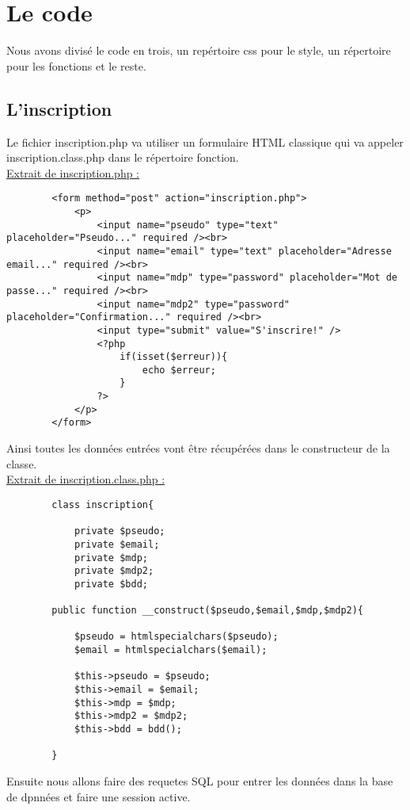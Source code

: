 \documentclass{article}
\begin{document}
    \section{Le code}
    Nous avons divisé le code en trois, un repértoire css pour le style, un répertoire pour les fonctions et le reste. 
    \subsection{L'inscription}
    Le fichier inscription.php va utiliser un formulaire HTML classique qui va appeler inscription.class.php dans le répertoire fonction. \\
    \underline{Extrait de inscription.php :} 
    \begin{lstlisting}
        <form method="post" action="inscription.php">
            <p>
                <input name="pseudo" type="text" placeholder="Pseudo..." required /><br>
                <input name="email" type="text" placeholder="Adresse email..." required /><br>
                <input name="mdp" type="password" placeholder="Mot de passe..." required /><br>
                <input name="mdp2" type="password" placeholder="Confirmation..." required /><br>
                <input type="submit" value="S'inscrire!" />
                <?php 
                    if(isset($erreur)){
                        echo $erreur;
                    }
                ?>
            </p>
        </form>
    \end{lstlisting}
    Ainsi toutes les données entrées vont être récupérées dans le constructeur de la classe. \\
    \underline{Extrait de inscription.class.php :}
    \begin{lstlisting}
        class inscription{
    
            private $pseudo;
            private $email;
            private $mdp;
            private $mdp2;
            private $bdd;
    
        public function __construct($pseudo,$email,$mdp,$mdp2){
    
            $pseudo = htmlspecialchars($pseudo);
            $email = htmlspecialchars($email);
        
            $this->pseudo = $pseudo; 
            $this->email = $email;
            $this->mdp = $mdp;
            $this->mdp2 = $mdp2;
            $this->bdd = bdd();
        
        }
    \end{lstlisting}
    Ensuite nous allons faire des requetes SQL pour entrer les données dans la base de dpnnées et faire une session active. 
\end{document}

